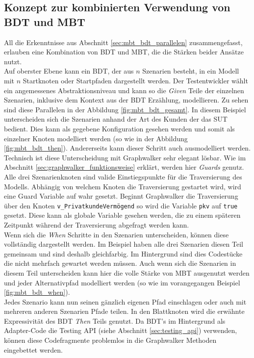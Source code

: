 \subsection{Konzept zur kombinierten Verwendung von BDT und MBT}
\label{sec:mbt_bdt_concept}
All die Erkenntnisse aus Abschnitt \ref{sec:mbt_bdt_parallelen} zusammengefasst, erlauben eine Kombination von \Gls{BDT} und \Gls{MBT}, die die Stärken beider Ansätze nutzt.\\
Auf oberster Ebene kann ein \Gls{BDT}, der aus $n$ Szenarien besteht, in ein Modell mit $n$ Startknoten oder Startpfaden dargestellt werden. Der Testentwickler wählt ein angemessenes Abstraktionsniveau und kann so die \textit{Given} Teile der einzelnen Szenarien, inklusive dem Kontext aus der \Gls{BDT} Erzählung, modellieren. Zu sehen sind diese Parallelen in der Abbildung \ref{fig:mbt_bdt_gesamt}. In diesem Beispiel unterscheiden sich die Szenarien anhand der Art des Kunden der das \Gls{SUT} bedient. Dies kann als gegebene Konfiguration gesehen werden und somit als einzelner Knoten modelliert werden (so wie in der Abbildung \ref{fig:mbt_bdt_then}). Andererseits kann dieser Schritt auch ausmodelliert werden. Technisch ist diese Unterscheidung mit Graphwalker sehr elegant lösbar. Wie im Abschnitt \ref{sec:graphwalker_funktionsweise}  erklärt, werden hier \textit{Guards} genutz. Alle drei Szenarienknoten sind valide Einstiegspunkte für die Traversierung des Modells. Abhängig von welchem Knoten die Traversierung gestartet wird, wird eine Guard Variable auf wahr gesetzt. Beginnt Graphwalker die Traversierung über den Knoten \texttt{v\_PrivatkundeVermögend} so wird die Variable \texttt{pkv} auf \texttt{true} gesetzt. Diese kann als globale Variable gesehen werden, die zu einem späteren Zeitpunkt während der Traversierung abgefragt werden kann.\\
Wenn sich die \textit{When} Schritte in den Szenarien unterscheiden, können diese vollständig dargestellt werden. Im Beispiel haben alle drei Szenarien diesen Teil gemeinsam und sind deshalb gleichfarbig. Im Hintergrund sind dies Codestücke die nicht mehrfach gewartet werden müssen. Auch wenn sich die Szenarien in diesem Teil unterscheiden kann hier die volle Stärke von \Gls{MBT} ausgenutzt werden und jeder Alternativpfad modelliert werden (so wie im vorangegangen Beispiel \ref{fig:mbt_bdt_when}).\\
Jedes Szenario kann nun seinen gänzlich eigenen Pfad einschlagen oder auch mit mehreren anderen Szenarien Pfade teilen. In den Blattknoten wird die erwähnte Expressivität des \Gls{BDT} \textit{Then} Teils genutzt. Da \Gls{BDT}'s im Hintergrund als Adapter-Code die Testing API (siehe Abschnitt \ref{sec:testing_api}) verwenden, können diese Codefragmente problemlos in die Graphwalker Methoden eingebettet werden.\\
